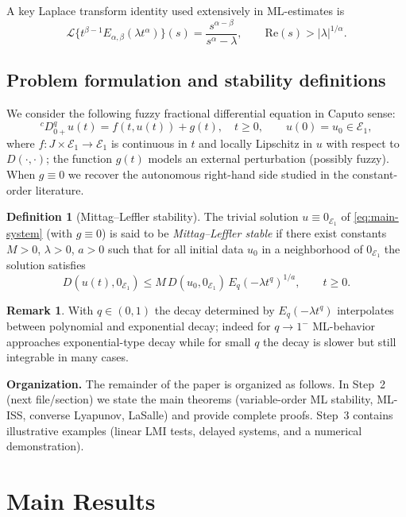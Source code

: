 \documentclass[11pt,a4paper]{article}
\theoremstyle{plain}
\theoremstyle{definition}
\newtheorem{definition}[theorem]{Definition}
\newtheorem{remark}[theorem]{Remark}
\theoremstyle{remark}
\newcommand{\E}{\mathcal{E}_1}
\newcommand{\Haus}{D}
\begin{document}
	A key Laplace transform identity used extensively in ML-estimates is
	$$\mathcal{L}\{ t^{\beta-1} E_{\alpha,\beta}(\lambda t^{\alpha})\}(s)=\frac{s^{\alpha-\beta}}{s^{\alpha}-\lambda},\qquad \mathrm{Re}(s)>|\lambda|^{1/\alpha}.$$ 
	
	\subsection{Problem formulation and stability definitions}
	We consider the following fuzzy fractional differential equation in Caputo sense:
	\begin{equation}\label{eq:main-system}
		{}^cD_{0+}^q u(t)=f(t,u(t))+g(t),\quad t\ge0,\qquad u(0)=u_0\in\E,
	\end{equation}
	where $f:J\times\E\to\E$ is continuous in $t$ and locally Lipschitz in $u$ with respect to $\Haus(\cdot,\cdot)$; the function $g(t)$ models an external perturbation (possibly fuzzy). When $g\equiv0$ we recover the autonomous right-hand side studied in the constant-order literature.
	
	\begin{definition}[Mittag--Leffler stability]
		The trivial solution $u\equiv0_{\E}$ of \eqref{eq:main-system} (with $g\equiv0$) is said to be \emph{Mittag--Leffler stable} if there exist constants $M>0$, $\lambda>0$, $a>0$ such that for all initial data $u_0$ in a neighborhood of $0_{\E}$ the solution satisfies
		$$\Haus(u(t),0_{\E})\le M\,\Haus(u_0,0_{\E})\,E_q(-\lambda t^q)^{1/a},\qquad t\ge0.
		$$
	\end{definition}
	
	\begin{remark}
		With $q\in(0,1)$ the decay determined by $E_q(-\lambda t^q)$ interpolates between polynomial and exponential decay; indeed for $q\to1^-$ ML-behavior approaches exponential-type decay while for small $q$ the decay is slower but still integrable in many cases.
	\end{remark}
	
	\medskip
	\noindent\textbf{Organization.} The remainder of the paper is organized as follows. In Step~2 (next file/section) we state the main theorems (variable-order ML stability, ML-ISS, converse Lyapunov, LaSalle) and provide complete proofs. Step~3 contains illustrative examples (linear LMI tests, delayed systems, and a numerical demonstration).
	\section{Main Results }\label{sec:main-results-corrected}
	
\end{document}
